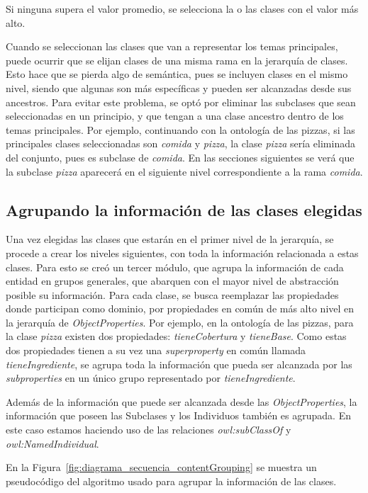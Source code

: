Si ninguna supera el valor promedio, se selecciona la o las clases con el valor más alto.

Cuando se seleccionan las clases que van a representar los temas principales, puede ocurrir que se elijan clases de una misma rama en la jerarquía de clases. Esto hace que se pierda algo de semántica, pues se incluyen clases en el mismo nivel, siendo que algunas son más específicas y pueden ser alcanzadas desde sus ancestros. Para evitar este problema, se optó por eliminar las subclases que sean seleccionadas en un principio, y que tengan a una clase ancestro dentro de los temas principales. Por ejemplo, continuando con la ontología de las pizzas, si las principales clases seleccionadas son \emph{comida} y \emph{pizza}, la clase \emph{pizza} sería eliminada del conjunto, pues es subclase de \emph{comida}. En las secciones siguientes se verá que la subclase \emph{pizza} aparecerá en el siguiente nivel correspondiente a la rama \emph{comida}.

\subsection{Agrupando la información de las clases elegidas}
\label{sec:agrupando_info}
Una vez elegidas las clases que estarán en el primer nivel de la jerarquía, se procede a crear los niveles siguientes, con toda la información relacionada a estas clases. Para esto se creó un tercer módulo, que agrupa la información de cada entidad en grupos generales, que abarquen con el mayor nivel de abstracción posible su información. Para cada clase, se busca reemplazar las propiedades donde participan como dominio, por propiedades en común de más alto nivel en la jerarquía de \emph{ObjectProperties}. Por ejemplo, en la ontología de las pizzas, para la clase \emph{pizza} existen dos propiedades: \emph{tieneCobertura} y \emph{tieneBase}. Como estas dos propiedades tienen a su vez una \emph{superproperty} en común llamada \emph{tieneIngrediente}, se agrupa toda la información que pueda ser alcanzada por las \emph{subproperties} en un único grupo representado por \emph{tieneIngrediente}. 

Además de la información que puede ser alcanzada desde las \emph{ObjectProperties}, la información que poseen las Subclases y los Individuos también es agrupada. En este caso estamos haciendo uso de las relaciones \emph{owl:subClassOf} y \emph{owl:NamedIndividual}.

En la Figura~\ref{fig:diagrama_secuencia_contentGrouping} se muestra un pseudocódigo del algoritmo usado para agrupar la información de las clases.


